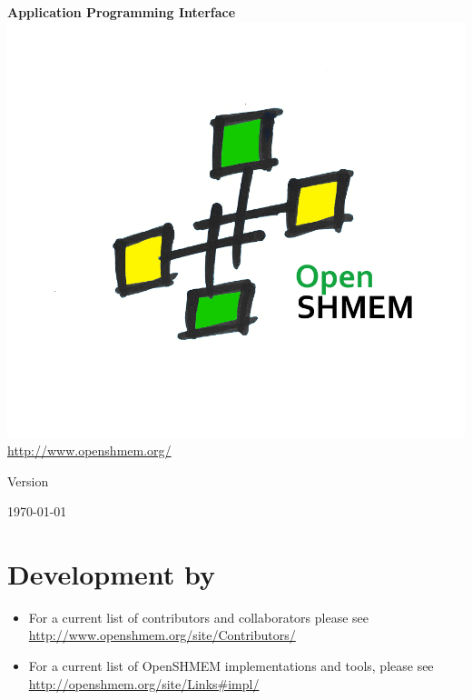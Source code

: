 \thispagestyle{empty}
\begin{center}
\textbf{\Huge \openshmem}
\par
\end{center}

\begin{center}
\textbf{\LARGE Application Programming Interface}\\
\includegraphics[scale=0.65]{figures/OpenSHMEM_Pound}\\
\url{http://www.openshmem.org/}
\par
\end{center}

\begin{center}
Version \insertDocVersion
\par
\end{center}

\vspace{0.5in}
\begin{center}
\today
\end{center}

\vspace{0.5in}

\vfill{}

\section*{Development by}
\begin{itemize}
\item For a current list of contributors and collaborators please see\\
  \url{http://www.openshmem.org/site/Contributors/}
\item For a current list of OpenSHMEM implementations and tools, please see\\
  \url{http://openshmem.org/site/Links#impl/}

\end{itemize}

